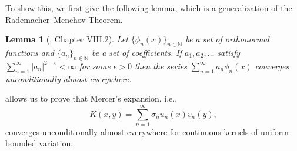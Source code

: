 \documentclass{article}
\newtheorem{lemma}{Lemma}
\begin{document}
To show this, we first give the following lemma, which is a generalization of the Rademacher--Menchov Theorem. 
\begin{lemma}[\citet{kashin2005orthogonal}, Chapter VIII.2]\label{lem:ONSunconditional}
Let $\{\phi_n(x)\}_{n\in\mathbb{N}}$ be a set of orthonormal functions and $\{a_n\}_{n\in \mathbb{N}}$ be a set of coefficients. If $a_1, a_2, \dots$ satisfy $\sum_{n=1}^\infty |a_n|^{2-\epsilon} < \infty$ for some $\epsilon>0$ then the series $\sum_{n=1}^\infty a_n \phi_n(x)$ converges unconditionally almost everywhere. 
\end{lemma}

 allows us to prove that Mercer's expansion, i.e., 
\[
K(x,y) = \sum_{n=1}^\infty \sigma_nu_n(x)v_n(y),
\]
converges unconditionally almost everywhere for continuous kernels of uniform bounded variation. 
\end{document}
